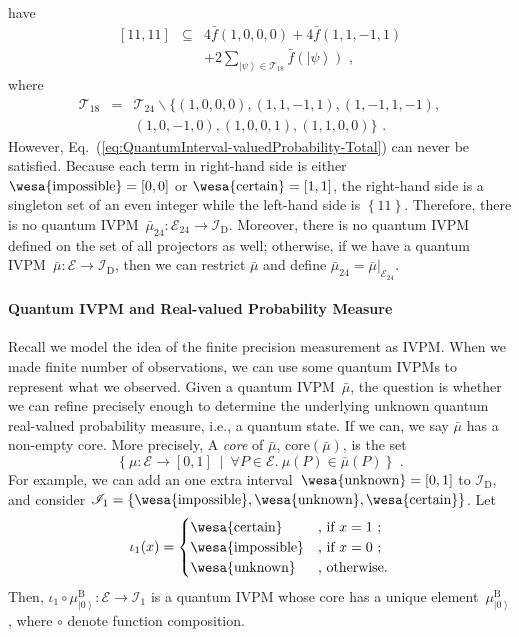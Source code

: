 \documentclass[english,reprint, aps, prl,superscriptaddress, showpacs,
showkeys]{revtex4-1}
\theoremstyle{plain}
\theoremstyle{definition}
\newcommand{\events}{\ensuremath{\mathcal{E}}}
\newcommand{\pmeas}{\ensuremath{\mu}}
\newcommand{\imposs}{{\mbox{\wesa{impossible}}}}
\newcommand{\necess}{{\mbox{\wesa{certain}}}}
\newcommand{\unknown}{{\mbox{\wesa{unknown}}}}
\newcommand{\ket}[1]{{\left\vert{#1}\right\rangle}}
\newcommand{\set}[2]{\ensuremath{\left\{ {#1}~\middle|~{#2}\right\} }}
\begin{document}
have
\begin{eqnarray}
\left[11,11\right] & \subseteq & 4\bar{f}(1,0,0,0)+4\bar{f}(1,1,-1,1)\nonumber \\
 &  & +2\sum_{\ket{\psi}\in\mathcal{T}_{18}}\bar{f}\left(\ket{\psi}\right)\textrm{ ,}\label{eq:QuantumInterval-valuedProbability-Total}
\end{eqnarray}
where 
\begin{eqnarray}
\mathcal{T}_{18} & = & \mathcal{T}_{24}\backslash\{(1,0,0,0),(1,1,-1,1),(1,-1,1,-1),\nonumber \\
 &  & (1,0,-1,0),(1,0,0,1),(1,1,0,0)\}\textrm{ .}
\end{eqnarray}
However, Eq.~(\ref{eq:QuantumInterval-valuedProbability-Total})
can never be satisfied. Because each term in right-hand side is either
$\imposs=\left[0,0\right]$ or $\necess=\left[1,1\right]$, the right-hand
side is a singleton set of an even integer while the left-hand side
is $\left\{ 11\right\} $. Therefore, there is no quantum IVPM~$\bar{\mu}_{24}:\events_{24}\rightarrow\mathscr{I}_{\mathrm{D}}$.
Moreover, there is no quantum IVPM defined on the set of all projectors
as well; otherwise, if we have a quantum IVPM~$\bar{\mu}:\events\rightarrow\mathscr{I}_{\mathrm{D}}$,
then we can restrict $\bar{\mu}$ and define $\bar{\mu}_{24}=\left.\bar{\mu}\right|_{\events_{24}}$.

\paragraph{Quantum IVPM and Real-valued Probability Measure}

Recall we model the idea of the finite precision measurement as IVPM.
When we made finite number of observations, we can use some quantum
IVPMs to represent what we observed. Given a quantum IVPM~$\bar{\mu}$,
the question is whether we can refine precisely enough to determine
the underlying unknown quantum real-valued probability measure, i.e.,
a quantum state. If we can, we say $\bar{\mu}$ has a non-empty core.
More precisely, A \emph{core} of $\bar{\mu}$, $\mathrm{core}\left(\bar{\mu}\right)$,
is the set 
\begin{equation}
\set{\pmeas:\events\rightarrow[0,1]}{\forall P\in\events.~\pmeas\left(P\right)\in\bar{\mu}\left(P\right)}\textrm{ .}
\end{equation}
For example, we can add an one extra interval~$\unknown=\left[0,1\right]$
to $\mathscr{I}_{\mathrm{D}}$, and consider $\mathscr{I}_{1}=\left\{ \imposs,\unknown,\necess\right\} $.
Let 
\begin{equation}
\iota_{1}(x)=\begin{cases}
\necess & \text{, if }x=1\text{ ;}\\
\imposs & \text{, if }x=0\text{ ;}\\
\unknown & \text{, otherwise.}
\end{cases}\label{eq:homomorphism-1}
\end{equation}
Then, $\iota_{1}\circ\mu_{\ket{0}}^{\mathrm{\mathrm{B}}}:\events\rightarrow\mathscr{I}_{1}$
is a quantum IVPM whose core has a unique element~$\mu_{\ket{0}}^{\mathrm{\mathrm{B}}}$,
where $\circ$ denote function composition.
\end{document}
